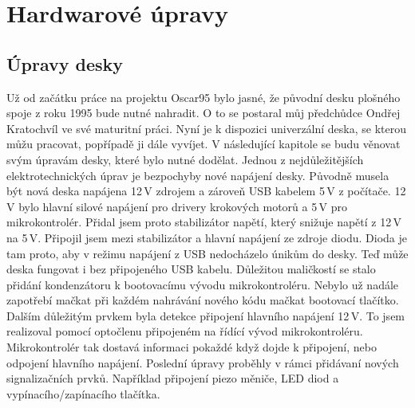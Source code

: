 \chapter{Hardwarové úpravy}

\section{Úpravy desky}Už od začátku práce na projektu Oscar95 bylo jasné, že původní desku plošného spoje z roku 1995 bude nutné nahradit. O to se postaral můj před\-chůd\-ce Ondřej Kratochvíl ve své maturitní práci. Nyní je k dispozici univerzální deska, se kterou můžu pracovat, popřípadě ji dále vyvíjet. \cite{Universalstepperboard} V následující kapitole se budu věnovat svým úpravám desky, které bylo nutné dodělat. Jednou z nejdůležitějších elektrotechnických úprav je bezpochyby nové napájení desky. Původně musela být nová deska napájena 12\,V zdrojem a zároveň USB kabelem 5\,V z počítače. 12\,V bylo hlavní silové napájení pro drivery krokových motorů a 5\,V pro mikrokontrolér. Přidal jsem proto stabilizátor napětí, který snižuje napětí z 12\,V na 5\,V. Připojil jsem mezi stabilizátor a hlavní napájení ze zdroje diodu. Dioda je tam proto, aby v režimu napájení z USB nedocházelo únikům do desky. Teď může deska fungovat i bez připojeného USB kabelu. Důležitou maličkostí se stalo přidání kondenzátoru k bootovacímu vývodu mikrokontroléru. Nebylo už nadále zapotřebí mačkat při každém nahrávání nového kódu mačkat bootovací tlačítko. Dalším důležitým prvkem byla detekce připojení hlavního napájení 12\,V. To jsem realizoval pomocí optočlenu připojeném na řídící vývod mikrokontroléru. Mikrokontrolér tak dostavá informaci pokaždé když dojde k připojení, nebo odpojení hlavního napájení. Poslední úpravy proběhly v rámci přidávaní nových signalizačních prvků.
\enlargethispage{20mm}
Například připojení piezo měniče, LED diod a  vypínacího/zapínacího tlačítka.  

